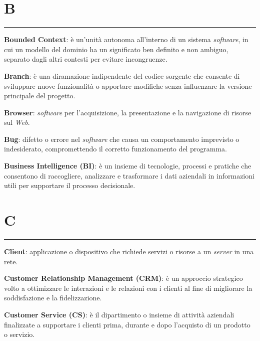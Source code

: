 \section*{B}
{\color{lightgray}\rule{\textwidth}{0.4pt}} %
\begin{glossaryitemize}
    \item \textbf{Bounded Context}: è un'unità autonoma all'interno di un sistema \textit{software}, in cui un modello del dominio ha un significato ben definito e non ambiguo, separato dagli altri contesti per evitare incongruenze.
    \item \textbf{Branch}: è una diramazione indipendente del codice sorgente che consente di sviluppare nuove funzionalità o apportare modifiche senza influenzare la versione principale del progetto.
    \item \textbf{Browser}: \textit{software} per l’acquisizione, la presentazione e la navigazione di risorse sul \textit{Web}.
    \item \textbf{Bug}: difetto o errore nel \textit{software} che causa un comportamento imprevisto o indesiderato, compromettendo il corretto funzionamento del programma.
    \item \textbf{Business Intelligence (BI)}: è un insieme di tecnologie, processi e pratiche che consentono di raccogliere, analizzare e trasformare i dati aziendali in informazioni utili per supportare il processo decisionale.
\end{glossaryitemize}

\section*{C}
{\color{lightgray}\rule{\textwidth}{0.4pt}} %
\begin{glossaryitemize}
    \item \textbf{Client}: applicazione o dispositivo che richiede servizi o risorse a un \textit{server} in una rete.
    \item \textbf{Customer Relationship Management (CRM)}: è un approccio strategico volto a ottimizzare le interazioni e le relazioni con i clienti al fine di migliorare la soddisfazione e la fidelizzazione.
    \item \textbf{Customer Service (CS)}: è il dipartimento o insieme di attività aziendali finalizzate a supportare i clienti prima, durante e dopo l'acquisto di un prodotto o servizio.
\end{glossaryitemize}

